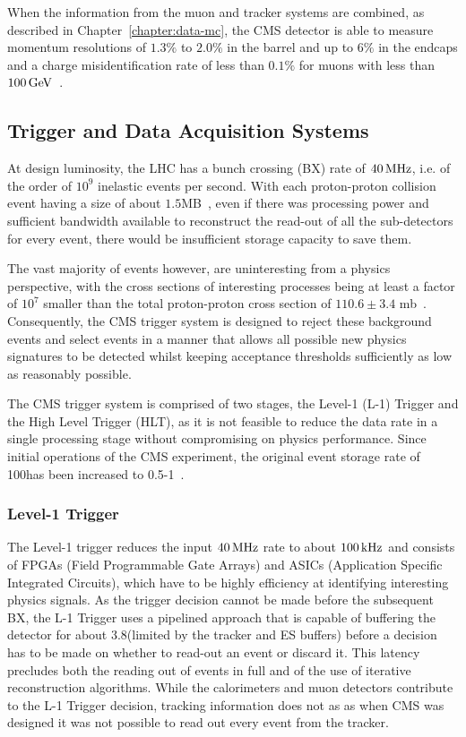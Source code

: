 When the information from the muon and tracker systems are combined, as described in Chapter~\ref{chapter:data-mc}, the CMS detector is able to measure momentum resolutions of $1.3\%$ to $2.0\%$ in the barrel and up to $6\%$ in the endcaps and a charge misidentification rate of less than $0.1\%$ for muons with \pT less than $100 \,\text{Ge\hspace{-.08em}V}$~\cite{Chatrchyan:2012xi,Chatrchyan:2013sba}.

\subsection{Trigger and Data Acquisition Systems}\label{subsec:trigger}
At design luminosity, the LHC has a bunch crossing (BX) rate of $40\text{\,MHz}$, i.e. of the order of $10^{9}$ inelastic events per second.
With each proton-proton collision event having a size of about $1.5$MB~\cite{Bayatian:2006nff}, even if there was processing power and sufficient bandwidth available to reconstruct the read-out of all the sub-detectors for every event, there would be insufficient storage capacity to save them.

The vast majority of events however, are uninteresting from a physics perspective, with the cross sections of interesting processes being at least a factor of $10^{7}$ smaller than the total proton-proton cross section of $110.6 \pm 3.4$ mb~\cite{Antchev:2017dia}.
Consequently, the CMS trigger system is designed to reject these background events and select events in a manner that allows all possible new physics signatures to be detected whilst keeping acceptance thresholds sufficiently as low as reasonably possible.

The CMS trigger system is comprised of two stages, the Level-1 (L-1) Trigger and the High Level Trigger (HLT), as it is not feasible to reduce the data rate in a single processing stage without compromising on physics performance.
Since initial operations of the CMS experiment, the original event storage rate of 100\Hz has been increased to 0.5-1\kHz~\cite{Dasu:2000ge,phase1L1TDR}.

\subsubsection{Level-1 Trigger}\label{paragraph:L1}
The Level-1 trigger reduces the input $40\text{\,MHz}$ rate to about $100\text{\,kHz}$ and consists of FPGAs (Field Programmable Gate Arrays) and ASICs (Application Specific Integrated Circuits), which have to be highly efficiency at identifying interesting physics signals.
As the trigger decision cannot be made before the subsequent BX, the L-1 Trigger uses a pipelined approach that is capable of buffering the detector for about 3.8\mus (limited by the tracker and ES buffers) before a decision has to be made on whether to read-out an event or discard it. 
This latency precludes both the reading out of events in full and of the use of iterative reconstruction algorithms.
While the calorimeters and muon detectors contribute to the L-1 Trigger decision, tracking information does not as as when CMS was designed it was not possible to read out every event from the tracker.

